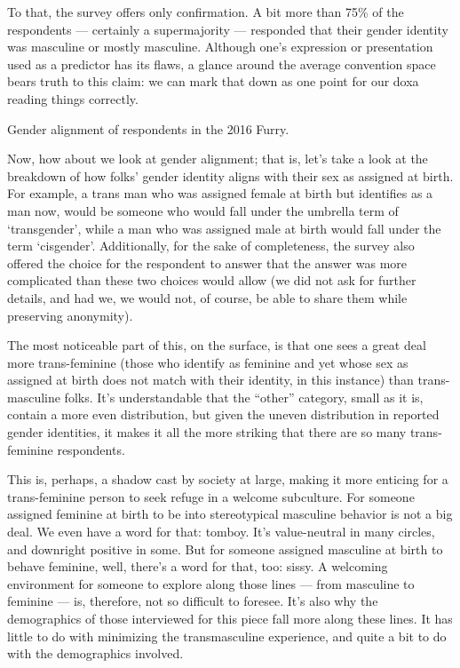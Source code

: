 To that, the survey offers only confirmation. A bit more than 75\% of the respondents --- certainly a supermajority --- responded that their gender identity was masculine or mostly masculine. Although one's expression or presentation used as a predictor has its flaws, a glance around the average convention space bears truth to this claim: we can mark that down as one point for our doxa reading things correctly.

Gender alignment of respondents in the 2016 Furry.

Now, how about we look at gender alignment; that is, let's take a look at the breakdown of how folks' gender identity aligns with their sex as assigned at birth. For example, a trans man who was assigned female at birth but identifies as a man now, would be someone who would fall under the umbrella term of `transgender', while a man who was assigned male at birth would fall under the term `cisgender'. Additionally, for the sake of completeness, the survey also offered the choice for the respondent to answer that the answer was more complicated than these two choices would allow (we did not ask for further details, and had we, we would not, of course, be able to share them while preserving anonymity).

The most noticeable part of this, on the surface, is that one sees a great deal more trans-feminine (those who identify as feminine and yet whose sex as assigned at birth does not match with their identity, in this instance) than trans-masculine folks. It's understandable that the ``other'' category, small as it is, contain a more even distribution, but given the uneven distribution in reported gender identities, it makes it all the more striking that there are so many trans-feminine respondents.

This is, perhaps, a shadow cast by society at large, making it more enticing for a trans-feminine person to seek refuge in a welcome subculture. For someone assigned feminine at birth to be into stereotypical masculine behavior is not a big deal. We even have a word for that: tomboy. It's value-neutral in many circles, and downright positive in some. But for someone assigned masculine at birth to behave feminine, well, there's a word for that, too: sissy. A welcoming environment for someone to explore along those lines --- from masculine to feminine --- is, therefore, not so difficult to foresee. It's also why the demographics of those interviewed for this piece fall more along these lines. It has little to do with minimizing the transmasculine experience, and quite a bit to do with the demographics involved.

